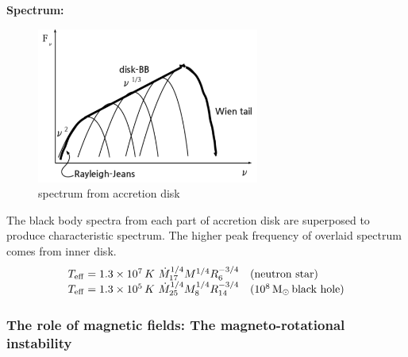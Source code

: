 \textbf{Spectrum:}
\begin{figure}[!htbp]
   \centering
   \includegraphics[width=0.65\textwidth]{HighEnergy/bhSpectrum}
   \caption{spectrum from accretion disk}
\end{figure}

The black body spectra from each part of accretion disk are superposed to produce characteristic spectrum.
The higher peak frequency of overlaid spectrum comes from inner disk. 
\[ \left. \begin{array}{ll}
  T_{\rm eff} = 1.3\times 10^{7} \,K ~ \dot{M}_{17}^{1/4} M^{1/4} R_{6}^{-3/4} & \textrm{(neutron star)} \\
  T_{\rm eff} = 1.3\times 10^{5} \,K ~ \dot{M}_{25}^{1/4} M_{8}^{1/4} R_{14}^{-3/4} & (10^{8}\,{\rm M_{\odot}}\,\textrm{black hole)} 
\end{array} \right. \]

\subsubsection{The role of magnetic fields: The magneto-rotational instability}

